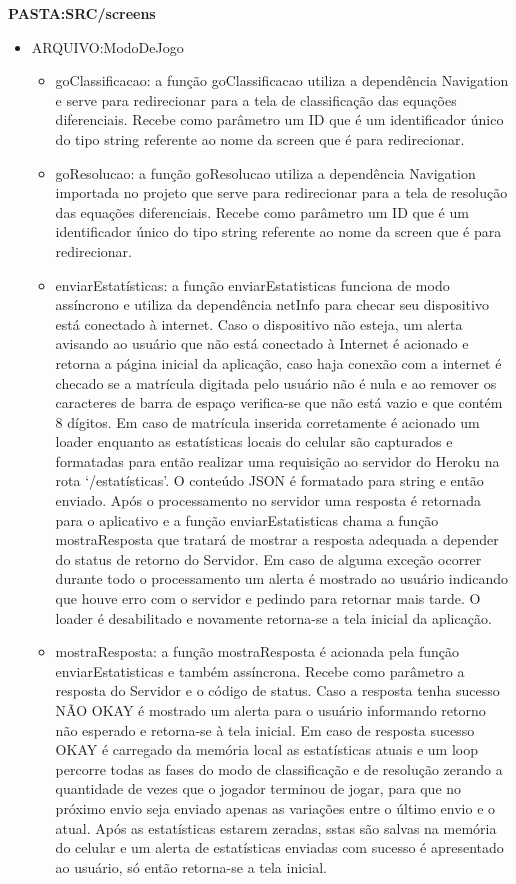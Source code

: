 \textbf{PASTA:SRC/screens}
\begin{itemize}
\item ARQUIVO:ModoDeJogo
	\begin{itemize}
	\item goClassificacao: a função goClassificacao utiliza a dependência Navigation e serve para redirecionar para a tela de classificação das equações diferenciais. Recebe como parâmetro um ID que é um identificador único do tipo string referente ao nome da screen que é para redirecionar.

	\item goResolucao: a função goResolucao utiliza a dependência Navigation importada no projeto que serve para redirecionar para a tela de resolução das equações diferenciais. Recebe como parâmetro um ID que é um identificador único do tipo string referente ao nome da screen que é para redirecionar.

	\item enviarEstatísticas: a função enviarEstatisticas funciona de modo assíncrono e utiliza da dependência netInfo para checar seu dispositivo está conectado à internet. Caso o dispositivo não esteja, um alerta avisando ao usuário que não está conectado à Internet é acionado e retorna a página inicial da aplicação, caso haja conexão com a internet é checado se a matrícula digitada pelo usuário não é nula e ao remover os caracteres de barra de espaço verifica-se que não está vazio e que contém 8 dígitos. Em caso de matrícula inserida corretamente é acionado um loader enquanto as estatísticas locais do celular são capturados e formatadas para então realizar uma requisição ao servidor do Heroku na rota ‘/estatísticas’. O conteúdo JSON é formatado para string e então enviado. Após o processamento no servidor uma resposta é retornada para o aplicativo e a função enviarEstatisticas chama a função mostraResposta que tratará de mostrar a resposta adequada a depender do status de retorno do Servidor. Em caso de alguma exceção ocorrer durante todo o processamento um alerta é mostrado ao usuário indicando que houve erro com o servidor e pedindo para retornar mais tarde. O loader é desabilitado e novamente retorna-se a tela inicial da aplicação.

	\item mostraResposta: a função mostraResposta é acionada pela função enviarEstatisticas e também assíncrona. Recebe como parâmetro a resposta do Servidor e o código de status. Caso a resposta tenha sucesso NÃO OKAY é mostrado um alerta para o usuário informando retorno não esperado e retorna-se à tela inicial. Em caso de resposta sucesso OKAY é carregado da memória local as estatísticas atuais e um loop percorre todas as fases do modo de classificação e de resolução zerando a quantidade de vezes que o jogador terminou de jogar, para que no próximo envio seja enviado apenas as variações entre o último envio e o atual. Após as estatísticas estarem zeradas, sstas são salvas na memória do celular e um alerta de estatísticas enviadas com sucesso é apresentado ao usuário, só então retorna-se a tela inicial.


\end{itemize}
\end{itemize}
